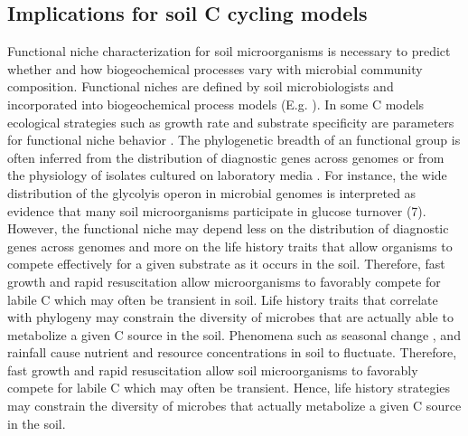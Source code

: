\subsection{Implications for soil C cycling models}
Functional niche characterization for soil microorganisms is necessary to
predict whether and how biogeochemical processes vary with microbial community
composition. Functional niches are defined by soil microbiologists and
incorporated into biogeochemical process models (E.g.
\citep{wieder_2014a,Kaiser2014a}). In some C models ecological strategies such
as growth rate and substrate specificity are parameters for functional niche
behavior \citep{Kaiser2014a}. The phylogenetic breadth of an functional group
is often inferred from the distribution of diagnostic genes across genomes
\citep{Berlemont2013} or from the physiology of isolates cultured on laboratory
media \citep{Martiny2013}. For instance, the wide distribution of the glycolyis
operon in microbial genomes is interpreted as evidence that many soil
microorganisms participate in glucose turnover (7). 
However, the functional niche may depend less on the distribution of diagnostic
genes across genomes and more on the life history traits that allow organisms
to compete effectively for a given substrate as it occurs in the soil.
Therefore, fast growth and rapid resuscitation allow microorganisms to
favorably compete for labile C which may often be transient in soil. Life
history traits that correlate with phylogeny may constrain the diversity of
microbes that are actually able to metabolize a given C source in the soil.
Phenomena such as seasonal change \citep{Schmidt2007}, and rainfall
\citep{Evans2014a} cause nutrient and resource concentrations in soil to
fluctuate. Therefore, fast growth and rapid resuscitation allow soil
microorganisms to favorably compete for labile C which may often be transient.
Hence, life history strategies may constrain the diversity of microbes that
actually metabolize a given C source in the soil. 

